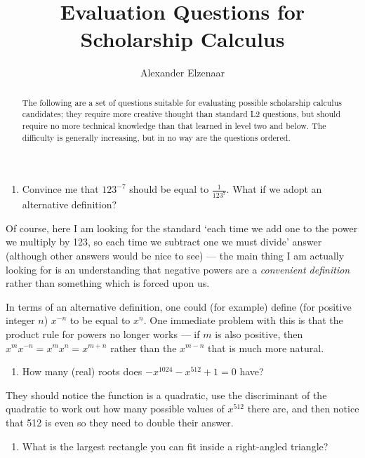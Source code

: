 \documentclass{amsart}
\title{Evaluation Questions for Scholarship Calculus}
\author{Alexander Elzenaar}
\begin{document}
\maketitle
\begin{abstract}
  The following are a set of questions suitable for evaluating possible scholarship calculus candidates; they require
  more creative thought than standard L2 questions, but should require no more technical knowledge than that learned
  in level two and below. The difficulty is generally increasing, but in no way are the questions ordered.
\end{abstract}

\begin{enumerate}\bfseries
  \item Convince me that $ 123^{-7} $ should be equal to $ \frac{1}{123^7} $. What if we adopt an alternative definition?
\end{enumerate}

Of course, here I am looking for the standard `each time we add one to the power we multiply by 123, so each time we subtract
one we must divide' answer (although other answers would be nice to see) --- the main thing I am actually looking for is an
understanding that negative powers are a \emph{convenient definition} rather than something which is forced upon us.

In terms of an alternative definition, one could (for example) define (for positive integer $ n $) $ x^{-n} $ to be equal to $ x^n $.
One immediate problem with this is that the product rule for powers no longer works --- if $ m $ is also positive, then $ x^m x^{-n} = x^m x^n = x^{m + n} $
rather than the $ x^{m - n} $ that is much more natural.

\filbreak\begin{enumerate}[resume]\bfseries
  \item How many (real) roots does $ -x^{1024} - x^{512} + 1 = 0 $ have?
\end{enumerate}

They should notice the function is a quadratic, use the discriminant of the quadratic to work out how many possible
values of $ x^{512} $ there are, and then notice that 512 is even so they need to double their answer.

\filbreak\begin{enumerate}[resume]\bfseries
  \item What is the largest rectangle you can fit inside a right-angled triangle?
\end{enumerate}
\end{document}
